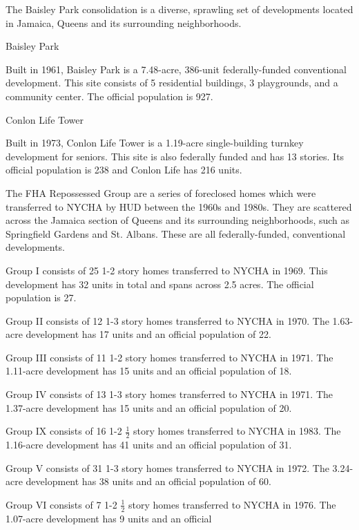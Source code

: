 The Baisley Park consolidation is a diverse, sprawling set of developments located in Jamaica, Queens and its surrounding neighborhoods. \par \vspace{.7\baselineskip}Baisley Park \par \vspace{.7\baselineskip}Built in 1961, Baisley Park is a 7.48-acre, 386-unit federally-funded conventional development. This site consists of 5 residential buildings, 3 playgrounds, and a community center. The official population is 927. \par \vspace{.7\baselineskip}Conlon Life Tower \par \vspace{.7\baselineskip}Built in 1973, Conlon Life Tower is a 1.19-acre single-building turnkey development for seniors. This site is also federally funded and has 13 stories. Its official population is 238 and Conlon Life has 216 units. \par \vspace{.7\baselineskip}The FHA Repossessed Group are a series of foreclosed homes which were transferred to NYCHA by HUD between the 1960s and 1980s. They are scattered across the Jamaica section of Queens and its surrounding neighborhoods, such as Springfield Gardens and St. Albans. These are all federally-funded, conventional developments. \par \vspace{.7\baselineskip}Group I consists of 25 1-2 story homes transferred to NYCHA in 1969. This development has 32 units in total and spans across 2.5 acres. The official population is 27. \par \vspace{.7\baselineskip}Group II consists of 12 1-3 story homes transferred to NYCHA in 1970. The 1.63-acre development has 17 units and an official population of 22. \par \vspace{.7\baselineskip}Group III consists of 11 1-2 story homes transferred to NYCHA in 1971. The 1.11-acre development has 15 units and an official population of 18. \par \vspace{.7\baselineskip}Group IV consists of 13 1-3 story homes transferred to NYCHA in 1971. The 1.37-acre development has 15 units and an official population of 20. \par \vspace{.7\baselineskip}Group IX consists of 16 1-2 $\frac{1}{2}$ story homes transferred to NYCHA in 1983. The 1.16-acre development has 41 units and an official population of 31. \par \vspace{.7\baselineskip}Group V consists of 31 1-3 story homes transferred to NYCHA in 1972. The 3.24-acre development has 38 units and an official population of 60. \par \vspace{.7\baselineskip}Group VI consists of 7 1-2 $\frac{1}{2}$ story homes transferred to NYCHA in 1976. The 1.07-acre development has 9 units and an official 